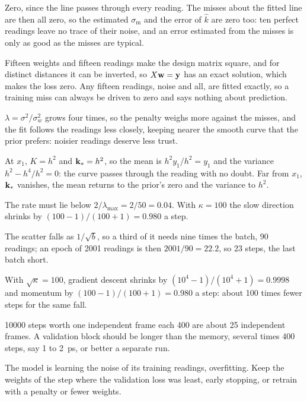 \label{sec:lo-answers}

Zero, since the line passes through every reading.
The misses about the fitted line are then all zero, so the estimated
$\sigma_{\mathrm m}$ and the error of $\hat k$ are zero too: ten perfect
readings leave no trace of their noise, and an error estimated from the
misses is only as good as the misses are typical.

Fifteen weights and fifteen readings make the
design matrix square, and for distinct distances it can be inverted, so
$X\bm{\mathrm{w}} = \bm{\mathrm{y}}$ has an exact solution, which makes the loss zero. Any
fifteen readings, noise and all, are fitted exactly, so a training miss
can always be driven to zero and says nothing about prediction.

$\lambda = \sigma^2/\sigma_w^2$ grows four times,
so the penalty weighs more against the misses, and the fit follows the
readings less closely, keeping nearer the smooth curve that the prior
prefers: noisier readings deserve less trust.

At $x_1$, $K = h^2$ and $\bm{\mathrm{k}}_\ast = h^2$, so the
mean is $h^2y_1/h^2 = y_1$ and the variance $h^2 - h^4/h^2 = 0$: the curve
passes through the reading with no doubt. Far from $x_1$, $\bm{\mathrm{k}}_\ast$
vanishes, the mean returns to the prior's zero and the variance to $h^2$.

The rate must lie below $2/\lambda_{\max} = 2/50 = 0.04$. With $\kappa =
100$ the slow direction shrinks by $(100 - 1)/(100 + 1) = 0.980$ a step.

The scatter falls as $1/\sqrt b$, so a third of it
needs nine times the batch, 90 readings; an epoch of 2001 readings is then
$2001/90 = 22.2$, so 23 steps, the last batch short.

With $\sqrt\kappa = 100$, gradient descent
shrinks by $(10^4 - 1)/(10^4 + 1) = 0.9998$ and momentum by $(100 -
1)/(100 + 1) = 0.980$ a step: about 100 times fewer steps for the same
fall.

\num{10000} steps worth one independent frame
each 400 are about 25 independent frames. A validation block should be
longer than the memory, several times 400 steps, say 1 to
\SI{2}{\pico\second}, or better a separate run.

The model is learning the noise of its
training readings, overfitting. Keep the weights of the step where the
validation loss was least, early stopping, or retrain with a penalty or
fewer weights.
